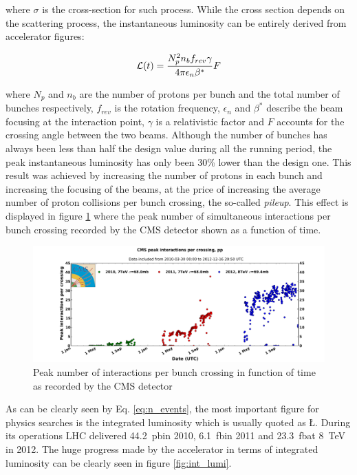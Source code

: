 where $\sigma$ is the cross-section for such process. While the cross section depends on the scattering process, the instantaneous luminosity can be entirely derived from accelerator figures:

\begin{equation} 
	\operatorname{{\cal L}}(t) = \frac{N_p^2 n_b f_{rev} \gamma }{4 \pi \epsilon_{n} \beta^*} F
	\label{eq:lumi}
\end{equation} 

where $N_p$ and $n_b$ are the number of protons per bunch and the total number of bunches respectively, $f_{rev}$ is the rotation frequency, $\epsilon_{n}$ and $\beta^*$ describe the beam focusing at the interaction point, $\gamma$ is a relativistic factor and $F$ accounts for the crossing angle between the two beams. Although the number of bunches has always been less than half the design value during all the running period, the peak instantaneous luminosity has only been 30\% lower than the design one. This result was achieved by increasing the number of protons in each bunch and increasing the focusing of the beams, at the price of increasing the average number of proton collisions per bunch crossing, the so-called \emph{pileup}. This effect is displayed in figure \ref{fig:lhc_pileup} where the peak number of simultaneous interactions per bunch crossing recorded by the CMS detector shown as a function of time.

\begin{figure}
\begin{center}
\includegraphics[angle=-0,width=\textwidth]{2_LHC_and_CMS/pics/peak_pu_pp.pdf}
\caption{Peak number of interactions per bunch crossing in function of time as recorded by the CMS detector
\label{fig:lhc_pileup}
}
\end{center}
\end{figure}

As can be clearly seen by Eq. \ref{eq:n_events}, the most important figure for physics searches is the integrated luminosity which is usually quoted as \L. During its operations LHC delivered 44.2~pb\Inv in 2010, 6.1~fb\Inv in 2011 and 23.3~fb\Inv at 8~TeV in 2012. The huge progress made by the accelerator in terms of integrated luminosity can be clearly seen in figure \ref{fig:int_lumi}.

